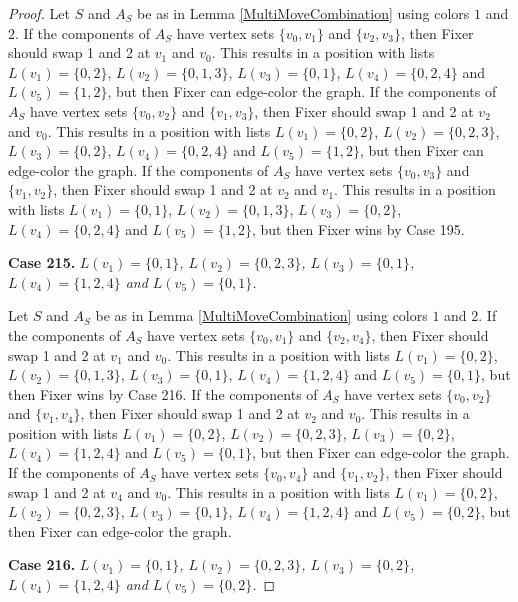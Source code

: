 \documentclass[12pt]{amsart}
\theoremstyle{plain}
\theoremstyle{definition}
\theoremstyle{remark}
\begin{document}
\begin{proof}
Let $S$ and $A_S$ be as in Lemma \ref{MultiMoveCombination} using colors $1$ and $2$. If the components of $A_S$ have vertex sets $\{v_0, v_1\}$ and $\{v_2, v_3\}$, then Fixer should swap 1 and 2 at $v_1$ and $v_0$. This results in a position with lists $L(v_1) = \{0, 2\}$, $L(v_2) = \{0, 1, 3\}$, $L(v_3) = \{0, 1\}$, $L(v_4) = \{0, 2, 4\}$ and $L(v_5) = \{1, 2\}$, but then Fixer can edge-color the graph.
If the components of $A_S$ have vertex sets $\{v_0, v_2\}$ and $\{v_1, v_3\}$, then Fixer should swap 1 and 2 at $v_2$ and $v_0$. This results in a position with lists $L(v_1) = \{0, 2\}$, $L(v_2) = \{0, 2, 3\}$, $L(v_3) = \{0, 2\}$, $L(v_4) = \{0, 2, 4\}$ and $L(v_5) = \{1, 2\}$, but then Fixer can edge-color the graph.
If the components of $A_S$ have vertex sets $\{v_0, v_3\}$ and $\{v_1, v_2\}$, then Fixer should swap 1 and 2 at $v_2$ and $v_1$. This results in a position with lists $L(v_1) = \{0, 1\}$, $L(v_2) = \{0, 1, 3\}$, $L(v_3) = \{0, 2\}$, $L(v_4) = \{0, 2, 4\}$ and $L(v_5) = \{1, 2\}$, but then Fixer wins by Case 195.

\noindent\textbf{Case 215.  }\textit{$L(v_1) = \{0, 1\}$, $L(v_2) = \{0, 2, 3\}$, $L(v_3) = \{0, 1\}$, $L(v_4) = \{1, 2, 4\}$ and $L(v_5) = \{0, 1\}$.}

Let $S$ and $A_S$ be as in Lemma \ref{MultiMoveCombination} using colors $1$ and $2$. If the components of $A_S$ have vertex sets $\{v_0, v_1\}$ and $\{v_2, v_4\}$, then Fixer should swap 1 and 2 at $v_1$ and $v_0$. This results in a position with lists $L(v_1) = \{0, 2\}$, $L(v_2) = \{0, 1, 3\}$, $L(v_3) = \{0, 1\}$, $L(v_4) = \{1, 2, 4\}$ and $L(v_5) = \{0, 1\}$, but then Fixer wins by Case 216.
If the components of $A_S$ have vertex sets $\{v_0, v_2\}$ and $\{v_1, v_4\}$, then Fixer should swap 1 and 2 at $v_2$ and $v_0$. This results in a position with lists $L(v_1) = \{0, 2\}$, $L(v_2) = \{0, 2, 3\}$, $L(v_3) = \{0, 2\}$, $L(v_4) = \{1, 2, 4\}$ and $L(v_5) = \{0, 1\}$, but then Fixer can edge-color the graph.
If the components of $A_S$ have vertex sets $\{v_0, v_4\}$ and $\{v_1, v_2\}$, then Fixer should swap 1 and 2 at $v_4$ and $v_0$. This results in a position with lists $L(v_1) = \{0, 2\}$, $L(v_2) = \{0, 2, 3\}$, $L(v_3) = \{0, 1\}$, $L(v_4) = \{1, 2, 4\}$ and $L(v_5) = \{0, 2\}$, but then Fixer can edge-color the graph.

\noindent\textbf{Case 216.  }\textit{$L(v_1) = \{0, 1\}$, $L(v_2) = \{0, 2, 3\}$, $L(v_3) = \{0, 2\}$, $L(v_4) = \{1, 2, 4\}$ and $L(v_5) = \{0, 2\}$.}


\end{proof}
\end{document}
